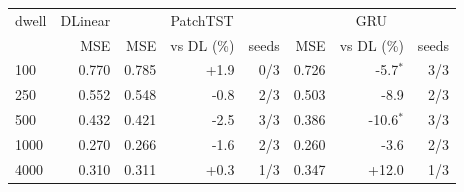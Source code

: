 \begin{tabular}{lrrrrrrr}
\toprule
dwell & DLinear & \multicolumn{3}{c}{PatchTST} & \multicolumn{3}{c}{GRU}\\
 & MSE & MSE & vs DL (\%) & seeds & MSE & vs DL (\%) & seeds\\
\midrule
100 & 0.770 & 0.785 & +1.9 & 0/3 & 0.726 & -5.7$^\ast$ & 3/3\\
250 & 0.552 & 0.548 & -0.8 & 2/3 & 0.503 & -8.9 & 2/3\\
500 & 0.432 & 0.421 & -2.5 & 3/3 & 0.386 & -10.6$^\ast$ & 3/3\\
1000 & 0.270 & 0.266 & -1.6 & 2/3 & 0.260 & -3.6 & 2/3\\
4000 & 0.310 & 0.311 & +0.3 & 1/3 & 0.347 & +12.0 & 1/3\\
\bottomrule
\end{tabular}